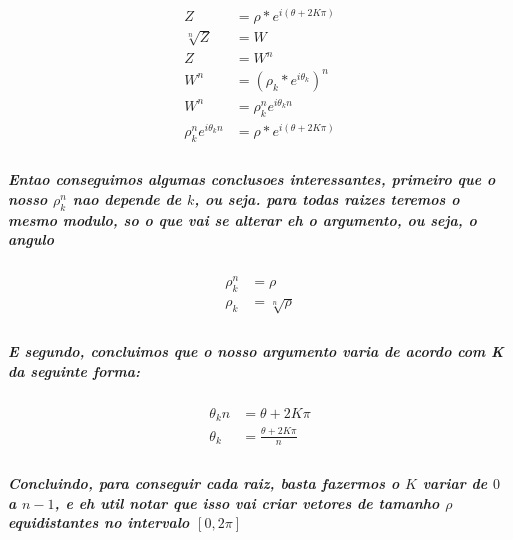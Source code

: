 \documentclass[12pt,twoside, a4paper, twocolumn]{article}
\begin{document}
\begin{equation*}
    \begin{aligned}
        Z                          & = \rho * e^{i (\theta + 2 K \pi)}        \\
        \sqrt[n]{Z}                & = W                                      \\
        Z                          & = W^n                                    \\
        W^n                        & =  \left(\rho_k * e^{i\theta_k}\right)^n \\
        W^n                        & =\rho_k ^n e^{i \theta_k n}              \\
        \rho_k ^n e^{i \theta_k n} & = \rho * e^{i (\theta + 2 K \pi)}        \\
    \end{aligned}
\end{equation*}

\subparagraph*{Entao conseguimos algumas conclusoes interessantes, primeiro que o nosso $\rho_k ^n$ nao depende de $k$, ou seja. para todas raizes teremos o mesmo modulo, so o que vai se alterar eh o argumento, ou seja, o angulo}

\begin{equation}
    \begin{aligned}
        \rho^n_k & = \rho           \\
        \rho_k   & = \sqrt[n]{\rho} \\
    \end{aligned}
\end{equation}

\subparagraph*{E segundo, concluimos que o nosso argumento varia de acordo com K da seguinte forma:}

\begin{equation}
    \begin{aligned}
        \theta_k n & = \theta + 2 K \pi           \\
        \theta_k   & = \frac{\theta + 2 K \pi}{n} \\
    \end{aligned}
\end{equation}

\subparagraph*{Concluindo, para conseguir cada raiz, basta fazermos o $K$ variar de $0$ a $n-1$, e eh util notar que isso vai criar vetores de tamanho $\rho$ equidistantes no intervalo $[0,2\pi]$}


\end{document}

